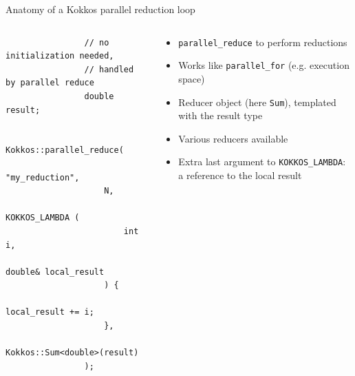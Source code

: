 \documentclass[aspectratio=169]{beamer}
\begin{document}
\begin{frame}[fragile]{Anatomy of a Kokkos parallel reduction loop}
    \begin{columns}
        \begin{column}{0.5\linewidth}
            \begin{verbatim}
                // no initialization needed,
                // handled by parallel reduce
                double result;

                Kokkos::parallel_reduce(
                    "my_reduction",
                    N,
                    KOKKOS_LAMBDA (
                        int i,
                        double& local_result
                    ) {
                        local_result += i;
                    },
                    Kokkos::Sum<double>(result)
                );
            \end{verbatim}
        \end{column}
        \begin{column}{0.5\linewidth}
            \begin{itemize}
                \item \texttt{parallel\_reduce} to perform reductions
                \item Works like \texttt{parallel\_for} (e.g. execution space)
                \item Reducer object (here \texttt{Sum}), templated with the result type
                \item Various reducers available
                \item Extra last argument to \texttt{KOKKOS\_LAMBDA}: a reference to the local result
            \end{itemize}
        \end{column}
    \end{columns}
\end{frame}

\end{document}

